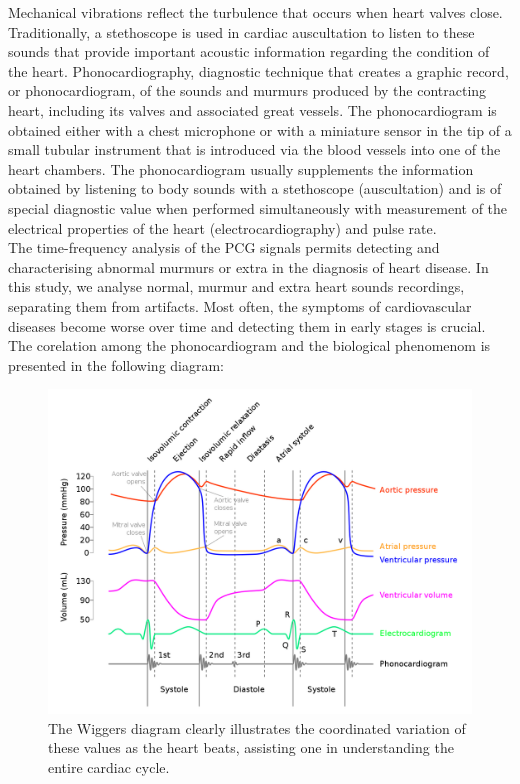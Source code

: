 \documentclass[11pt]{report}
\theoremstyle{plain}
\theoremstyle{definition}
\theoremstyle{definition}
\theoremstyle{proposition}
\begin{document}
Mechanical vibrations reflect the turbulence that occurs
when heart valves close. Traditionally, a stethoscope is used in
cardiac auscultation to listen to these sounds that provide
important acoustic information regarding the condition of the heart.
Phonocardiography, diagnostic technique that creates a graphic record, or phonocardiogram, of the sounds and murmurs produced by the contracting heart, including its valves and associated great vessels. The phonocardiogram is obtained either with a chest microphone or with a miniature sensor in the tip of a small tubular instrument that is introduced via the blood vessels into one of the heart chambers. The phonocardiogram usually supplements the information obtained by listening to body sounds with a stethoscope (auscultation) and is of special diagnostic value when performed simultaneously with measurement of the electrical properties of the heart (electrocardiography) and pulse rate.
\\


The time-frequency analysis of the PCG signals permits detecting and characterising abnormal murmurs or extra in the diagnosis of heart disease. In this study, we analyse normal, murmur and extra heart sounds recordings, separating them from artifacts. Most often, the symptoms of cardiovascular diseases become worse over time and detecting them in early stages is crucial.
\\

The corelation among the phonocardiogram and the biological phenomenom is presented in the following diagram:

\begin{figure}[h]
\includegraphics[width=15cm]{Wiggers_Diagram_2.png}
\centering
\caption{The Wiggers diagram clearly illustrates the coordinated variation of these values as the heart beats, assisting one in understanding the entire cardiac cycle.}
\end{figure}
\end{document}
